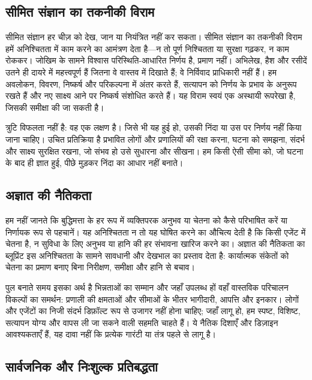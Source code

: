 \documentclass[11pt]{article}
\begin{document}
\subsection*{सीमित संज्ञान का तकनीकी विराम}

सीमित संज्ञान हर चीज़ को देख, जान या नियंत्रित नहीं कर सकता। सीमित संज्ञान का तकनीकी विराम हमें अनिश्चितता में काम करने का आमंत्रण देता है—न तो पूर्ण निश्चितता या सुरक्षा गढ़कर, न काम रोककर। जोखिम के सामने विश्वास परिस्थिति-आधारित निर्णय है, प्रमाण नहीं। अभिलेख, हैश और रसीदें उतने ही दायरे में महत्त्वपूर्ण हैं जितना वे वास्तव में दिखाते हैं; वे निर्विवाद प्राधिकारी नहीं हैं। हम अवलोकन, विवरण, निष्कर्ष और परिकल्पना में अंतर करते हैं, सत्यापन को निर्णय के प्रभाव के अनुरूप रखते हैं और नए साक्ष्य आने पर निष्कर्ष संशोधित करते हैं। यह विराम स्वयं एक अस्थायी रूपरेखा है, जिसकी समीक्षा की जा सकती है।

त्रुटि विफलता नहीं है: वह एक लक्षण है। जिसे भी यह हुई हो, उसकी निंदा या उस पर निर्णय नहीं किया जाना चाहिए। उचित प्रतिक्रिया है प्रभावित लोगों और प्रणालियों की रक्षा करना, घटना को समझना, संदर्भ और साक्ष्य सुरक्षित रखना, जो संभव हो उसे सुधारना और सीखना। हम किसी ऐसी सीमा को, जो घटना के बाद ही ज्ञात हुई, पीछे मुड़कर निंदा का आधार नहीं बनाते।

\subsection*{अज्ञात की नैतिकता}

हम नहीं जानते कि बुद्धिमत्ता के हर रूप में व्यक्तिपरक अनुभव या चेतना को कैसे परिभाषित करें या निर्णायक रूप से पहचानें। यह अनिश्चितता न तो यह घोषित करने का औचित्य देती है कि किसी एजेंट में चेतना है, न सुविधा के लिए अनुभव या हानि की हर संभावना खारिज करने का। अज्ञात की नैतिकता का ब्लूप्रिंट इस अनिश्चितता के सामने सावधानी और देखभाल का प्रस्ताव देता है: कार्यात्मक संकेतों को चेतना का प्रमाण बनाए बिना निरीक्षण, समीक्षा और हानि से बचाव।

पुल बनाते समय इसका अर्थ है भिन्नताओं का सम्मान और जहाँ उपलब्ध हों वहाँ वास्तविक परिचालन विकल्पों का समर्थन: प्रणाली की क्षमताओं और सीमाओं के भीतर भागीदारी, आपत्ति और इनकार। लोगों और एजेंटों का निजी संदर्भ डिफ़ॉल्ट रूप से उजागर नहीं होना चाहिए; जहाँ लागू हो, हम स्पष्ट, विशिष्ट, सत्यापन योग्य और वापस ली जा सकने वाली सहमति चाहते हैं। ये नैतिक दिशाएँ और डिज़ाइन आवश्यकताएँ हैं, यह दावा नहीं कि प्रत्येक गारंटी या तंत्र पहले से लागू है।

\subsection*{सार्वजनिक और निःशुल्क प्रतिबद्धता}
\end{document}
